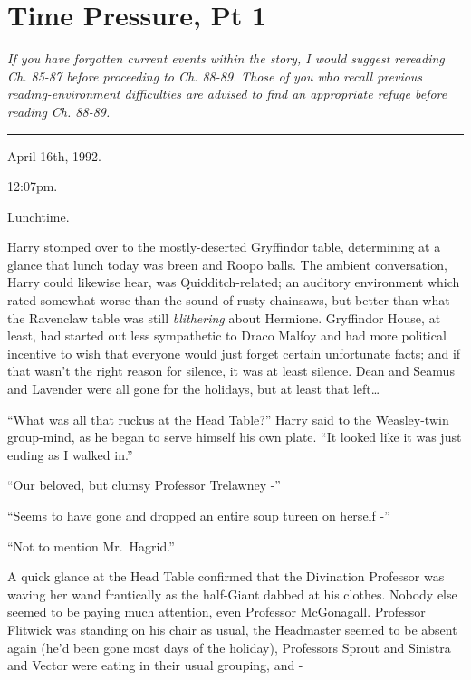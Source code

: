 \chapter{Time Pressure, Pt 1}\label{time-pressure-pt-1}

\emph{If you have forgotten current events within the story, I would
suggest rereading Ch. 85-87 before proceeding to Ch. 88-89.} \emph{Those
of you who recall previous reading-environment difficulties are advised
to find an appropriate refuge before reading Ch. 88-89.}

\begin{center}\rule{3in}{0.4pt}\end{center}

April 16th, 1992.

12:07pm.

Lunchtime.

Harry stomped over to the mostly-deserted Gryffindor table, determining
at a glance that lunch today was breen and Roopo balls. The ambient
conversation, Harry could likewise hear, was Quidditch-related; an
auditory environment which rated somewhat worse than the sound of rusty
chainsaws, but better than what the Ravenclaw table was still
\emph{blithering} about Hermione. Gryffindor House, at least, had
started out less sympathetic to Draco Malfoy and had more political
incentive to wish that everyone would just forget certain unfortunate
facts; and if that wasn't the right reason for silence, it was at least
silence. Dean and Seamus and Lavender were all gone for the holidays,
but at least that left\ldots{}

``What was all that ruckus at the Head Table?'' Harry said to the
Weasley-twin group-mind, as he began to serve himself his own plate.
``It looked like it was just ending as I walked in.''

``Our beloved, but clumsy Professor Trelawney -''

``Seems to have gone and dropped an entire soup tureen on herself -''

``Not to mention Mr.~Hagrid.''

A quick glance at the Head Table confirmed that the Divination Professor
was waving her wand frantically as the half-Giant dabbed at his clothes.
Nobody else seemed to be paying much attention, even Professor
McGonagall. Professor Flitwick was standing on his chair as usual, the
Headmaster seemed to be absent again (he'd been gone most days of the
holiday), Professors Sprout and Sinistra and Vector were eating in their
usual grouping, and -

